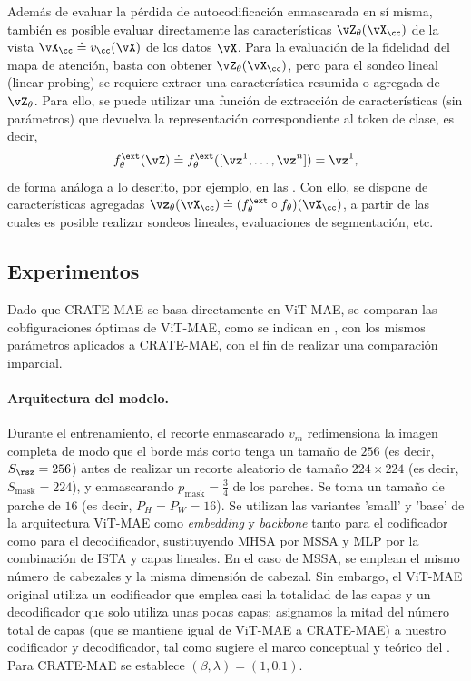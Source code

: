 \documentclass[../../book-main_es.tex]{subfiles}
\begin{document}
Además de evaluar la pérdida de autocodificación enmascarada en sí misma, también es
posible evaluar directamente las características \(\vZ_{\theta}(\vX_{\cc})\) de
la vista \(\vX_{\cc} \doteq v_{\cc}(\vX)\) de los datos \(\vX\).
Para la evaluación de la fidelidad del mapa de atención, basta con obtener
\(\vZ_{\theta}(\vX_{\cc})\), pero para el sondeo lineal (linear probing)
se requiere extraer una característica resumida o agregada de
\(\vZ_{\theta}\). Para ello, se puede utilizar una función de extracción de características (sin parámetros)
que devuelva la representación correspondiente al token de clase, es decir,
\begin{equation}
f_{\theta}^{\ext}(\vZ) \doteq f_{\theta}^{\ext}([\vz^{1}, \dots,
\vz^{n}]) = \vz^{1},
\end{equation}
de forma análoga a lo descrito, por ejemplo, en las
.
Con ello, se dispone de características agregadas
\(\vz_{\theta}(\vX_{\cc}) \doteq (f_{\theta}^{\ext} \circ
f_{\theta})(\vX_{\cc})\), a partir de las cuales es posible realizar sondeos lineales,
evaluaciones de segmentación, etc.

\subsection{Experimentos}\label{sub:image_completion_experiments}

Dado que CRATE-MAE se basa directamente en ViT-MAE, se comparan las cobfiguraciones óptimas
de ViT-MAE, como se indican en \citep{he2022masked}, con los mismos
parámetros aplicados a CRATE-MAE, con el fin de realizar una comparación imparcial.

\paragraph{Arquitectura del modelo.} Durante el entrenamiento, el recorte enmascarado
\(v_{m}\) redimensiona la imagen completa de modo que el borde más corto tenga un tamaño de
\(256\) (es decir, \(S_{\rsz} = 256\)) antes de realizar un recorte aleatorio de
tamaño \(224 \times 224\) (es decir, \(S_{\mathrm{mask}} = 224\)), y
enmascarando \(p_{\mathrm{mask}} = \frac{3}{4}\) de los parches. Se toma
un tamaño de parche de \(16\) (es decir, \(P_{H} = P_{W} = 16\)). Se utilizan las variantes 'small'
y 'base' de la arquitectura ViT-MAE como \textit{embedding} y
\textit{backbone} tanto para el codificador como para el decodificador, sustituyendo MHSA por MSSA y MLP 
por la combinación de ISTA y capas lineales. En el caso de MSSA,
se emplean el mismo número de cabezales y la misma dimensión de cabezal.
Sin embargo, el ViT-MAE original utiliza un codificador que emplea casi la totalidad de
las capas y un decodificador que solo utiliza unas pocas capas; 
asignamos la mitad del número total de capas (que se mantiene igual de
ViT-MAE a CRATE-MAE) a nuestro codificador y decodificador, tal como sugiere el
marco conceptual y teórico del
. Para
CRATE-MAE se establece \((\beta, \lambda) = (1, 0.1)\).
\end{document}
